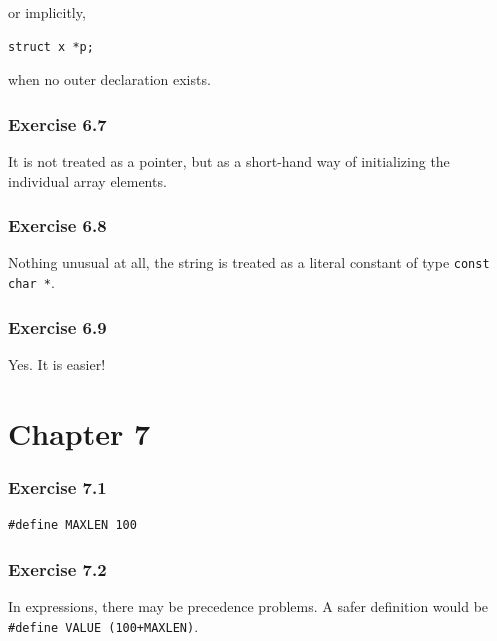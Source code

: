    or implicitly,


   \begin{Verbatim}
struct x *p;
\end{Verbatim}

   when no outer declaration exists.


  

  \subsubsection*{Exercise 6.7}

   It is not treated as a pointer, but as a short-hand way of initializing
    the individual array elements.


  

  \subsubsection*{Exercise 6.8}

   Nothing unusual at all, the string is treated as a literal constant of
    type \texttt{const char *}.


  

  \subsubsection*{Exercise 6.9}

   Yes. It is easier!


  

 
        \section*{Chapter 7}
        

  

  \subsubsection*{Exercise 7.1}

   \begin{Verbatim}
#define MAXLEN 100
\end{Verbatim}

  

  \subsubsection*{Exercise 7.2}

   In expressions, there may be precedence problems. A safer definition
    would be \texttt{\#define VALUE (100+MAXLEN)}.


